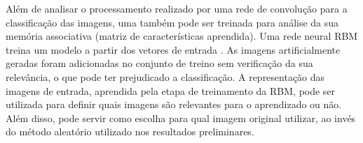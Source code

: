 Além de analisar o processamento realizado por uma rede de convolução para a classificação das imagens, uma  também pode ser treinada para análise da sua memória associativa (matriz de características aprendida). Uma rede neural RBM treina um modelo a partir dos vetores de entrada \cite{Fischer2014}. As imagens artificialmente geradas foram adicionadas no conjunto de treino sem verificação da sua relevância, o que pode ter prejudicado a classificação. A representação das imagens de entrada, aprendida pela etapa de treinamento da RBM, pode ser utilizada para definir quais imagens são relevantes para o aprendizado ou não. Além disso, pode servir como escolha para qual imagem original utilizar, ao invés do método aleatório utilizado nos resultados preliminares.
